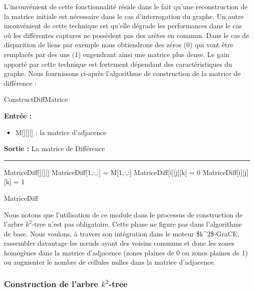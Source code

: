 \documentclass[a4paper,oneside,12pt]{report}
\theoremstyle{definition}
\begin{document}
L'inconvénient de cette fonctionnalité réside dans le fait qu'une reconstruction de la matrice initiale est nécessaire dans le cas d'interrogation du graphe. Un autre inconvénient de cette technique est qu'elle dégrade les performances dans le cas où les différentes captures ne possèdent pas des arêtes en commun. Dans le cas de disparition de liens par exemple nous obtiendrons des zéros (0) qui vont être remplacés par des uns (1) engendrant ainsi une matrice plus dense. Le gain apporté par cette technique est fortement dépendant des caractéristiques du graphe. 
Nous fournissons ci-après l'algorithme de construction de la matrice de différence :\\

	\begin{algorithm}[H]
					
					\caption{ConstructDiffMatrice}
					\label{alg:diffMat}
					\textbf{Entrée :}
						\begin{itemize}[label=$\bullet$]
							\item M[][][] : la matrice d'adjacence
						\end{itemize}
					\textbf{Sortie :} La matrice de Différence\\							\noindent\rule{\textwidth}{1pt}
						
						
				\begin{algorithmic} [1]
					\STATE MatriceDiff[][][]
					\STATE MatriceDiff[1,:,:] = M[1,:,:]
									\STATE MatriceDiff[i][j][k] = 0
								\ELSE
									\STATE MatriceDiff[i][j][k] = 1
								\ENDIF
							\ENDFOR
							
						\ENDFOR
					\ENDFOR
				
					\RETURN MatriceDiff
				\end{algorithmic}
			\end{algorithm}


Nous notons que l'utilisation de ce module dans le processus de construction de l'arbre $k^2$-tree n'est pas obligatoire. Cette phase ne figure pas dans l'algorithme de base. Nous voulons, à travers son intégration dans le moteur \gls{$k^2$-GraCE}, rassembler davantage les nœuds ayant des voisins communs et donc les zones homogènes dans la matrice d'adjacence (zones plaines de 0 ou zones plaines de 1) ou augmenter le nombre de cellules nulles dans la matrice d'adjacence.
		
			\subsubsection{Construction de l'arbre $k^2$-tree}
			
\end{document}
